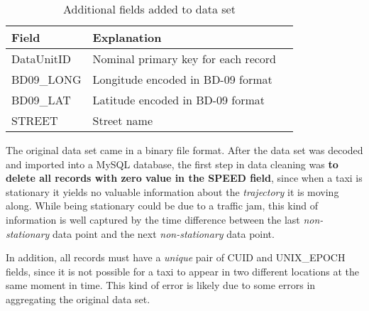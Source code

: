 \begin{table}
\centering
\begin{tabular}{ | l | l | l | }
\hline
\textbf{Field} & \textbf{Explanation} \\ \hline
DataUnitID & Nominal primary key for each record \\ \hline
BD09\_LONG & Longitude encoded in BD-09 format\\ \hline
BD09\_LAT & Latitude encoded in BD-09 format\\ \hline
STREET & Street name\\ \hline
\end{tabular}
\caption{Additional fields added to data set}\label{Ta:addtional_field}
\end{table}



The original data set came in a binary file format. After the data set was decoded and imported into a MySQL database, the first step in data cleaning was \textbf{to delete all records with zero value in the SPEED field}, since when a taxi is stationary it yields no valuable information about the \emph{trajectory} it is moving along. While being stationary could be due to a traffic jam, this kind of information is well captured by the time difference between the last \emph{non-stationary} data point and the next \emph{non-stationary} data point. 

In addition, all records must have a \emph{unique} pair of CUID and UNIX\_EPOCH fields, since it is not possible for a taxi to appear in two different locations at the same moment in time. This kind of error is likely due to some errors in aggregating the original data set.


